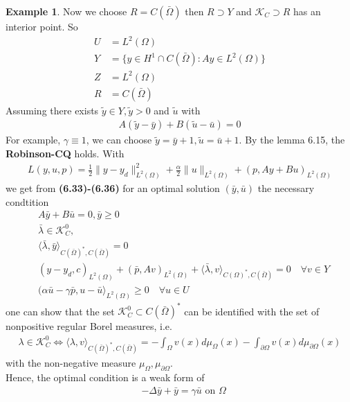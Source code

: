 \documentclass[a4paper,11pt,fleqn]{book}
\theoremstyle{definition}
\newtheorem*{example}{Example}
\theoremstyle{remark}
\begin{document}
\begin{example}
Now we choose $R = C(\bar{\Omega})$ then $R \supset Y$ and $\mathcal{K}_C \supset R$ has an interior point. So 
\begin{align*}
	U &= L^2(\Omega)\\
	Y &= \{y \in H^1 \cap C(\bar{\Omega}): Ay \in L^2(\Omega) \}\\
	Z &= L^2(\Omega)\\
	R &= C(\bar{\Omega}) 
\end{align*}
Assuming there exists $\tilde{y} \in Y, \tilde{y} > 0$ and $\tilde{u}$ with 
\begin{align*}
	A(\tilde{y} - \bar{y}) + B(\tilde{u} - \bar{u}) = 0
\end{align*}
For example, $\gamma \equiv 1$, we can choose $\tilde{y} = \bar{y} + 1, \tilde{u} = \bar{u} + 1$. By the lemma 6.15, the \textbf{Robinson-CQ} holds. With
\begin{align*}
	L(y, u, p) = \frac{1}{2}\| y - y_d\|^2_{L^2(\Omega)} + \frac{\alpha}{2}\|u\|_{L^2(\Omega)} + (p, Ay + Bu)_{L^2(\Omega)}
\end{align*}
we get from \textbf{(6.33)-(6.36)} for an optimal solution $(\bar{y}, \bar{u})$ the necessary condtition 
\begin{align*}
	&A \bar{y} + B\bar{u} = 0, \bar{y} \geq 0\\
	&\bar{\lambda} \in \mathcal{K}_C^0, \\
	&\langle \bar{\lambda}, \bar{y}\rangle_{C(\bar{\Omega})^*,C(\bar{\Omega})} = 0 \\
	&(y - y_d, c)_{L^2(\Omega)} + (\bar{p}, Av )_{L^2(\Omega)} + \langle \bar{\lambda}, v \rangle_{C(\Omega)^*, C(\bar{\Omega})} = 0 \quad \forall v \in Y\\
	&(\alpha \bar{u} - \gamma \bar{p}, u - \bar{u} \rangle_{L^2(\Omega)} \geq  0 \quad \forall u \in U
\end{align*}
one can show that the set $\mathcal{K}_C^0 \subset C(\bar{\Omega})^*$ can be identified with the set of nonpositive regular Borel measures, i.e. 
\begin{align*}
	\lambda \in \mathcal{K}^0_C \Leftrightarrow \langle \lambda , v \rangle_{C(\bar{\Omega})^*, C(\bar{\Omega})} = 
	- \int_\Omega v(x) d \mu_\Omega(x) - \int_{\partial \Omega} v(x) d\mu_{\partial \Omega}(x)
\end{align*}
with the non-negative measure $\mu_\Omega, \mu_{\partial\Omega}$. \\
Hence, the optimal condition is a weak form of
\begin{align*}
	&-\Delta \bar{y} + \bar{y} = \gamma \bar{u} \text{ on } \Omega\\

\end{align*}
\end{example}
\end{document}
